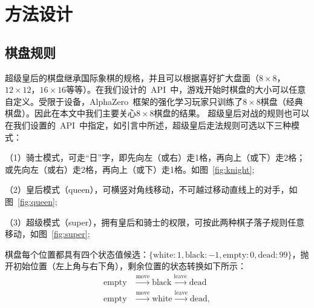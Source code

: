 \chapter{方法设计}
\label{chap:algorithm}

\section{棋盘规则}
超级皇后的棋盘继承国际象棋的规格，并且可以根据喜好扩大盘面（$8\times8$，$12\times12$，$16\times16$等等）。在我们设计的~API~中，游戏开始时棋盘的大小可以任意自定义。受限于设备，AlphaZero~框架的强化学习玩家只训练了$8\times8$棋盘（经典棋盘）。因此在本文中我们主要关心$8\times8$棋盘的结果。
超级皇后对战的规则也可以在我们设置的~API~中指定，如引言中所述，超级皇后走法规则可选以下三种模式：

（1）骑士模式，可走“日”字，即先向左（或右）走1格，再向上（或下）走2格；或先向左（或右）走2格，再向上（或下）走1格。如图~\ref{fig:knight};

（2）皇后模式（queen），可横竖对角线移动，不可越过移动直线上的对手，如图~\ref{fig:queen};

（3）超级模式（super），拥有皇后和骑士的权限，可按此两种棋子落子规则任意移动，如图~\ref{fig:super};

棋盘每个位置都具有四个状态值候选：$\{\text{white}:1, \text{black}:-1, \text{empty}:0, \text{dead}:99\}$，抛开初始位置（左上角与右下角），剩余位置的状态转换如下所示：
\begin{equation*}
    \begin{aligned}
    \text{empty} &\stackrel{\mathrm{move}}{\longrightarrow} \text{black} \stackrel{\mathrm{leave}}{\longrightarrow} \text{dead} \\
    \text{empty} &\stackrel{\mathrm{move}}{\longrightarrow} \text{white} \stackrel{\mathrm{leave}}{\longrightarrow} \text{dead},
    \end{aligned}
\end{equation*}


